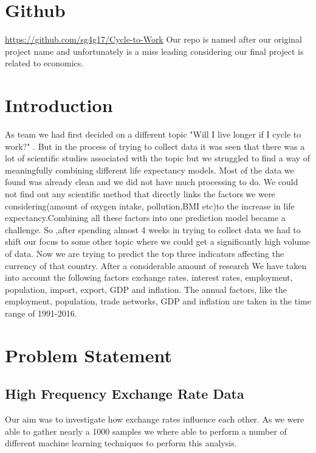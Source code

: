 \section{Github}

\href{https://github.com/sg4g17/Cycle-to-Work}{https://github.com/sg4g17/Cycle-to-Work}
\newline
Our repo is named after our original project name and unfortunately is a  miss leading considering our final project is related to economics.
\section{Introduction}
As team we had first decided on a different topic "Will I live longer if I cycle to work?" . But in the process of trying to collect data it was seen that there was a lot of scientific studies associated with the topic but we struggled to find a way of meaningfully combining different life expectancy models.  Most of the data we found was already clean and we did not have much processing to do\cite{iacono2008access}. We could not find out any scientific method that directly links the factors we were considering(amount of oxygen intake, pollution,BMI etc)to the increase in life expectancy\cite{edwards2014spinning}.Combining all these factors into one prediction model became a challenge.
\newline
So ,after spending almost 4 weeks in trying to collect data we had to shift our focus to some other topic where we could get a significantly high volume of data.  Now we are trying to predict the top three indicators affecting the currency of that country.  After a considerable amount of research We have taken into account the following factors exchange rates, interest rates, employment, population, import, export, GDP and inflation\cite{kuruwitaarachchi2018design}.  The annual factors, like the employment, population, trade networks, GDP and inflation are taken in the time range of 1991-2016.

\section{Problem Statement}
\subsection{High Frequency Exchange Rate Data}
Our aim was to investigate how exchange rates influence each other.  As we were able to gather nearly a 1000 samples we where able to perform a number of different machine learning techniques to perform this analysis.

